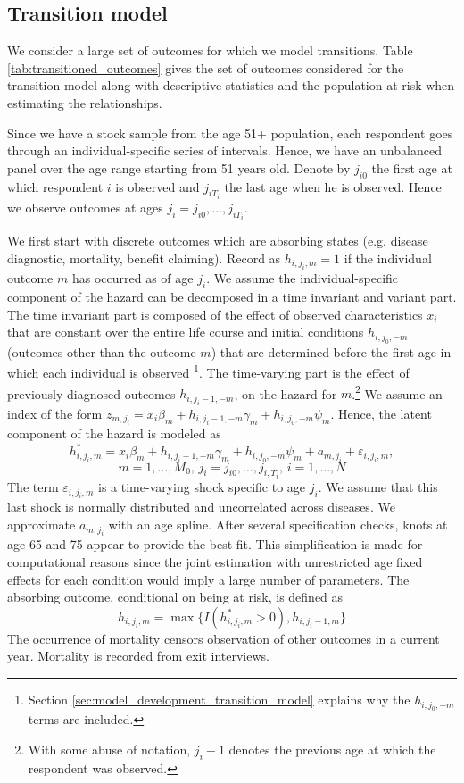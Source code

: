 \subsection{Transition model}
\label{sec:estimation_transition_model} 
We consider a large set of outcomes for which we model transitions. Table \ref{tab:transitioned_outcomes} gives the set of outcomes considered for the transition model 
along with descriptive statistics and the population at risk when estimating the relationships. 

Since we have a stock sample from the age 51+ population, each respondent goes through an individual-specific series of intervals. Hence, 
we have an unbalanced panel over the age range starting from 51 years old. Denote by $j_{i0}$ the first age at which respondent $i$ is 
observed and $j_{iT_i}$ the last age when he is observed. Hence we observe outcomes at ages $j_i = j_{i0},\ldots,j_{iT_i}$. 

We first start with discrete outcomes which are absorbing states (e.g. disease 
diagnostic, mortality, benefit claiming). Record as $h_{i,j_i,m}=1$ if the 
individual outcome $m$ has occurred as of age $j_i$. We assume the 
individual-specific component of the hazard can be decomposed in a time 
invariant and variant part. The time invariant part is composed of the effect of 
observed characteristics $x_i$ that are constant over the entire life course and 
initial conditions $h_{i,j_0,-m}$ (outcomes other than the outcome 
$m$) that are determined before the first age in which each individual is observed
\footnote{Section \ref{sec:model_development_transition_model} explains why the $h_{i,j_0,-m}$ terms are included.}. 
The time-varying part is the effect of previously diagnosed outcomes $h_{i,j_i-1,-m}$, 
on the hazard for $m$.\footnote{With some abuse of notation, $j_i-1$ denotes 
the previous age at which the respondent was observed.}  We assume an index of 
the form  $z_{m,j_i} = x_i\beta_m + h_{i,j_i-1,-m} \gamma_m + h_{i,j_0,-m}\psi_m$. Hence, the 
latent component of the hazard is modeled as 
\begin{equation}
h^*_{i,j_i,m}= x_i\beta_m + h_{i,j_i-1,-m} \gamma_m + h_{i,j_0,-m}\psi_m + a_{m,j_i} + \varepsilon_{i,j_i,m},
\label{eqn:transition_hzd_latent}
\end{equation}
\[
m = 1,\ldots,M_0 \mbox{, } j_i = j_{i0},\ldots,j_{i,T_i} \mbox{, } i=1,\ldots,N
\]
The term $\varepsilon_{i,j_i,m}$ is a time-varying shock specific to age $j_i$. 
We assume that this last shock is normally distributed and uncorrelated across 
diseases.  We approximate $a_{m,j_i}$ with an age spline. After several specification checks, 
knots at age 65 and 75 appear to provide the best fit. This simplification is made 
for computational reasons since the joint estimation with unrestricted age fixed 
effects for each condition would imply a large number of parameters.  The 
absorbing outcome, conditional on being at risk, is defined as 
\[
h_{i,j_i,m} = \max\{I(h^*_{i,j_i,m} > 0), h_{i,j_i-1,m}\}
\]
The occurrence of mortality censors observation of other 
outcomes in a current year. Mortality is recorded from exit interviews.

